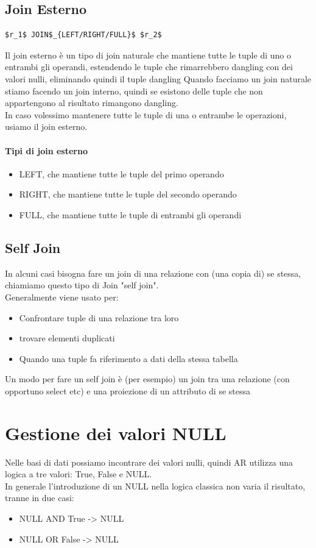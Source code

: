 \documentclass[12pt, a4paper, openany]{book}
\begin{document}
\subsection{Join Esterno}
\begin{lstlisting}[mathescape=true]
$r_1$ JOIN$_{LEFT/RIGHT/FULL}$ $r_2$
\end{lstlisting}
Il join esterno è un tipo di join naturale che mantiene tutte le tuple di uno o entrambi gli operandi, estendendo le tuple che rimarrebbero dangling con dei valori nulli, eliminando quindi il tuple dangling
Quando facciamo un join naturale stiamo facendo un join interno, quindi se esistono delle tuple che non appartengono al risultato rimangono dangling.
\\In caso volessimo mantenere tutte le tuple di una o entrambe le operazioni, usiamo il join esterno.
\paragraph{Tipi di join esterno}
\begin{itemize}
    \item LEFT, che mantiene tutte le tuple del primo operando
    \item RIGHT, che mantiene tutte le tuple del secondo operando
    \item FULL, che mantiene tutte le tuple di entrambi gli operandi
\end{itemize}

\subsection{Self Join}
In alcuni casi bisogna fare un join di una relazione con (una copia di) se stessa, chiamiamo questo tipo di Join "self join".
\\Generalmente viene usato per:
\begin{itemize}
    \item Confrontare tuple di una relazione tra loro
    \item trovare elementi duplicati
    \item Quando una tuple fa riferimento a dati della stessa tabella
\end{itemize}
Un modo per fare un self join è (per esempio) un join tra una relazione (con opportuno select etc) e una proiezione di un attributo di se stessa

\section{Gestione dei valori NULL}
Nelle basi di dati possiamo incontrare dei valori nulli, quindi AR utilizza una logica a tre valori: True, False e NULL.
\\In generale l'introduzione di un NULL nella logica classica non varia il risultato, tranne in due casi:
\begin{itemize}
    \item NULL AND True -> NULL
    \item NULL OR False -> NULL
\end{itemize}
\end{document}
